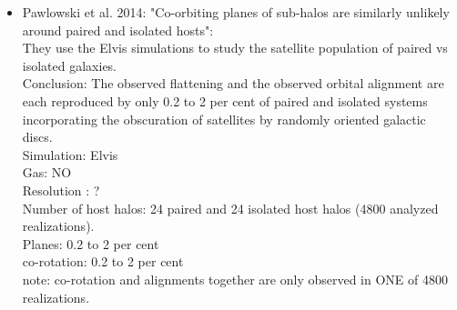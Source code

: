 \documentclass{emulateapj}
\begin{document}
\begin{itemize}
\item{ Pawlowski et al. 2014: "Co-orbiting planes of sub-halos are
similarly unlikely around paired and isolated hosts":\\
They use the Elvis simulations to study the satellite population of
paired vs isolated galaxies.\\
Conclusion: The observed flattening and the observed orbital alignment
are each reproduced by only 0.2 to 2 per cent of paired and isolated
systems incorporating the obscuration of satellites by randomly
oriented galactic discs.\\
Simulation: Elvis\\
Gas: NO\\
Resolution : ?\\
Number of host halos: 24 paired and 24 isolated host halos (4800
analyzed realizations).\\
Planes: 0.2 to 2 per cent\\
co-rotation: 0.2 to 2 per cent\\
note: co-rotation and alignments together are only observed in ONE of
4800 realizations.\\
}
\end{itemize}






\end{document}
